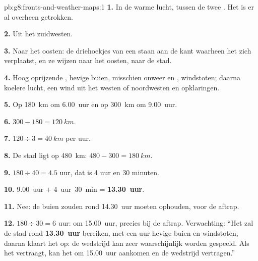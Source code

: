 \begin{solution}{pb:g8:fronts-and-weather-maps:1}
\textbf{1.} In de warme lucht, tussen de twee . Het  is
er al overheen getrokken.

\textbf{2.} Uit het zuidwesten.

\textbf{3.} Naar het oosten: de driehoekjes van een  staan aan de
kant waarheen het zich verplaatst, en ze wijzen naar het oosten, naar de
stad.

\textbf{4.} Hoog oprijzende , hevige buien, misschien onweer en
, windstoten; daarna koelere lucht, een wind uit het westen of
noordwesten en opklaringen.

\textbf{5.} Op \qty{180}{km} om 6.00~uur en op \qty{300}{km} om 9.00~uur.

\textbf{6.} $300 - 180 = \qty{120}{km}$.

\textbf{7.} $120 \div 3 = \qty{40}{km}$ per uur.

\textbf{8.} De stad ligt op \qty{480}{km}: $480 - 300 = \qty{180}{km}$.

\textbf{9.} $180 \div 40 = 4.5$ uur, dat is 4 uur en 30 minuten.

\textbf{10.} 9.00~uur + 4~uur~30~min = \textbf{13.30~uur}.

\textbf{11.} Nee: de buien zouden rond 14.30~uur moeten ophouden, voor de
aftrap.

\textbf{12.} $180 \div 30 = 6$ uur: om 15.00~uur, precies bij de aftrap.
Verwachting: ``Het  zal de stad rond \textbf{13.30~uur} bereiken,
met een uur hevige buien en windstoten, daarna klaart het op: de wedstrijd
kan zeer waarschijnlijk worden gespeeld. Als het  vertraagt, kan het
om 15.00~uur aankomen en de wedstrijd vertragen.''
\end{solution}
